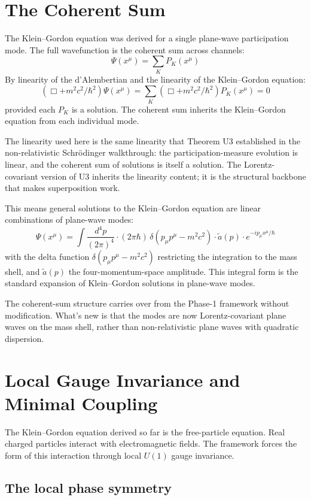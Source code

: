 \documentclass[11pt,a4paper]{article}
\begin{document}
\section{The Coherent Sum}

The Klein--Gordon equation was derived for a single plane-wave participation mode. The full wavefunction is the coherent sum across channels:
\[
\Psi(x^\mu) = \sum_K P_K(x^\mu)
\]
By linearity of the d'Alembertian and the linearity of the Klein--Gordon equation:
\[
(\Box + m^{2}c^{2}/\hbar^{2})\Psi(x^\mu) = \sum_K (\Box + m^{2}c^{2}/\hbar^{2})P_K(x^\mu) = 0
\]
provided each $P_K$ is a solution. The coherent sum inherits the Klein--Gordon equation from each individual mode.

The linearity used here is the same linearity that Theorem U3 established in the non-relativistic Schr\"odinger walkthrough: the participation-measure evolution is linear, and the coherent sum of solutions is itself a solution. The Lorentz-covariant version of U3 inherits the linearity content; it is the structural backbone that makes superposition work.

This means general solutions to the Klein--Gordon equation are linear combinations of plane-wave modes:
\[
\Psi(x^\mu) = \int \frac{d^{4}p}{(2\pi)^{4}}\cdot (2\pi\hbar)\, \delta(p_\mu p^\mu - m^{2}c^{2})\cdot \tilde a(p)\cdot e^{-ip_\mu x^\mu/\hbar}
\]
with the delta function $\delta(p_\mu p^\mu - m^2c^2)$ restricting the integration to the mass shell, and $\tilde a(p)$ the four-momentum-space amplitude. This integral form is the standard expansion of Klein--Gordon solutions in plane-wave modes.

The coherent-sum structure carries over from the Phase-1 framework without modification. What's new is that the modes are now Lorentz-covariant plane waves on the mass shell, rather than non-relativistic plane waves with quadratic dispersion.

\section{Local Gauge Invariance and Minimal Coupling}

The Klein--Gordon equation derived so far is the free-particle equation. Real charged particles interact with electromagnetic fields. The framework forces the form of this interaction through local $U(1)$ gauge invariance.

\subsection{The local phase symmetry}
\end{document}
